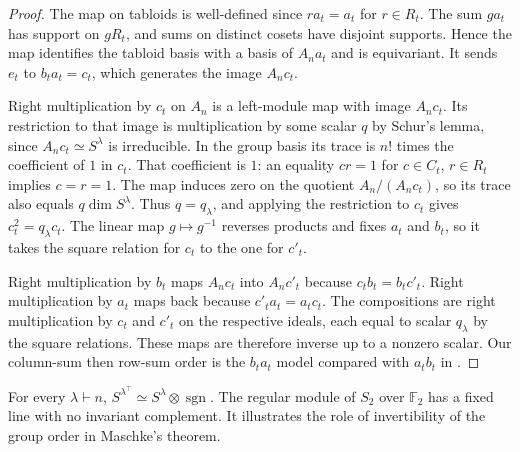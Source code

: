 \begin{proof}
The map on tabloids is well-defined since \(ra_t=a_t\) for \(r\in R_t\).
The sum \(ga_t\) has support on \(gR_t\), and sums on distinct cosets
have disjoint supports. Hence the map identifies the tabloid basis
with a basis of \(A_n a_t\) and is equivariant. It sends \(e_t\)
to \(b_t a_t=c_t\), which generates the image \(A_n c_t\).

Right multiplication by \(c_t\) on \(A_n\) is a left-module map with
image \(A_n c_t\). Its restriction to that image is multiplication
by some scalar \(q\) by Schur's lemma, since \(A_n c_t\simeq S^\lambda\)
is irreducible. In the group basis its trace is \(n!\) times the
coefficient of \(1\) in \(c_t\). That coefficient is \(1\): an equality
\(cr=1\) for \(c\in C_t\), \(r\in R_t\) implies \(c=r=1\).
The map induces zero on the quotient \(A_n/(A_n c_t)\), so its trace
also equals \(q\dim S^\lambda\). Thus \(q=q_\lambda\), and applying
the restriction to \(c_t\) gives \(c_t^2=q_\lambda c_t\).
The linear map \(g\mapsto g^{-1}\) reverses products and fixes \(a_t\)
and \(b_t\), so it takes the square relation for \(c_t\) to the
one for \(c'_t\).

Right multiplication by \(b_t\) maps \(A_n c_t\) into \(A_n c'_t\)
because \(c_t b_t=b_t c'_t\). Right multiplication by \(a_t\) maps
back because \(c'_t a_t=a_t c_t\). The compositions are right
multiplication by \(c_t\) and \(c'_t\) on the respective ideals,
each equal to scalar \(q_\lambda\) by the square relations. These
maps are therefore inverse up to a nonzero scalar. Our column-sum
then row-sum order is the \(b_t a_t\) model compared with \(a_t b_t\)
in \cite[Lemma 4.42 and Problem 4.68(a)]{etingof}.
\end{proof}

\begin{corollary}
\label{res:A09}
For every \(\lambda\vdash n\),
\(S^{\lambda^\top}\simeq S^\lambda\otimes\operatorname{sgn}\).
The regular module of \(S_2\) over \(\mathbb F_2\) has a fixed line
with no invariant complement. It illustrates the role of invertibility
of the group order in Maschke's theorem.
\end{corollary}

